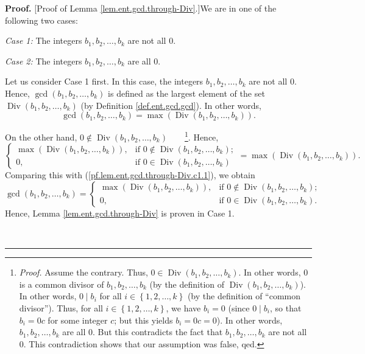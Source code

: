 \documentclass[numbers=enddot,12pt,final,onecolumn,notitlepage]{scrartcl}%
\numberwithin{exer}{subsection}
\theoremstyle{definition}
\newenvironment{proof}[1][Proof]{\noindent\textbf{#1.} }{\ \rule{0.5em}{0.5em}}
\begin{document}
\begin{proof}
[Proof of Lemma \ref{lem.ent.gcd.through-Div}.]We are in one of the following
two cases:

\textit{Case 1:} The integers $b_{1},b_{2},\ldots,b_{k}$ are not all $0$.

\textit{Case 2:} The integers $b_{1},b_{2},\ldots,b_{k}$ are all $0$.

Let us consider Case 1 first. In this case, the integers $b_{1},b_{2}%
,\ldots,b_{k}$ are not all $0$. Hence, $\gcd\left(  b_{1},b_{2},\ldots
,b_{k}\right)  $ is defined as the largest element of the set
$\operatorname*{Div}\left(  b_{1},b_{2},\ldots,b_{k}\right)  $ (by Definition
\ref{def.ent.gcd.gcd}). In other words,
\begin{equation}
\gcd\left(  b_{1},b_{2},\ldots,b_{k}\right)  =\max\left(  \operatorname*{Div}%
\left(  b_{1},b_{2},\ldots,b_{k}\right)  \right)  .
\label{pf.lem.ent.gcd.through-Div.c1.1}%
\end{equation}


On the other hand, $0\notin\operatorname*{Div}\left(  b_{1},b_{2},\ldots
,b_{k}\right)  $\ \ \ \ \footnote{\textit{Proof.} Assume the contrary. Thus,
$0\in\operatorname*{Div}\left(  b_{1},b_{2},\ldots,b_{k}\right)  $. In other
words, $0$ is a common divisor of $b_{1},b_{2},\ldots,b_{k}$ (by the
definition of $\operatorname*{Div}\left(  b_{1},b_{2},\ldots,b_{k}\right)  $).
In other words, $0\mid b_{i}$ for all $i\in\left\{  1,2,\ldots,k\right\}  $
(by the definition of \textquotedblleft common divisor\textquotedblright).
Thus, for all $i\in\left\{  1,2,\ldots,k\right\}  $, we have $b_{i}=0$ (since
$0\mid b_{i}$, so that $b_{i}=0c$ for some integer $c$; but this yields
$b_{i}=0c=0$). In other words, $b_{1},b_{2},\ldots,b_{k}$ are all $0$. But
this contradicts the fact that $b_{1},b_{2},\ldots,b_{k}$ are not all $0$.
This contradiction shows that our assumption was false, qed.}. Hence,%
\[%
\begin{cases}
\max\left(  \operatorname*{Div}\left(  b_{1},b_{2},\ldots,b_{k}\right)
\right)  , & \text{if }0\notin\operatorname*{Div}\left(  b_{1},b_{2}%
,\ldots,b_{k}\right)  ;\\
0, & \text{if }0\in\operatorname*{Div}\left(  b_{1},b_{2},\ldots,b_{k}\right)
\end{cases}
=\max\left(  \operatorname*{Div}\left(  b_{1},b_{2},\ldots,b_{k}\right)
\right)  .
\]
Comparing this with (\ref{pf.lem.ent.gcd.through-Div.c1.1}), we obtain%
\[
\gcd\left(  b_{1},b_{2},\ldots,b_{k}\right)  =%
\begin{cases}
\max\left(  \operatorname*{Div}\left(  b_{1},b_{2},\ldots,b_{k}\right)
\right)  , & \text{if }0\notin\operatorname*{Div}\left(  b_{1},b_{2}%
,\ldots,b_{k}\right)  ;\\
0, & \text{if }0\in\operatorname*{Div}\left(  b_{1},b_{2},\ldots,b_{k}\right)
.
\end{cases}
\]
Hence, Lemma \ref{lem.ent.gcd.through-Div} is proven in Case 1.


\end{proof}
\end{document}
